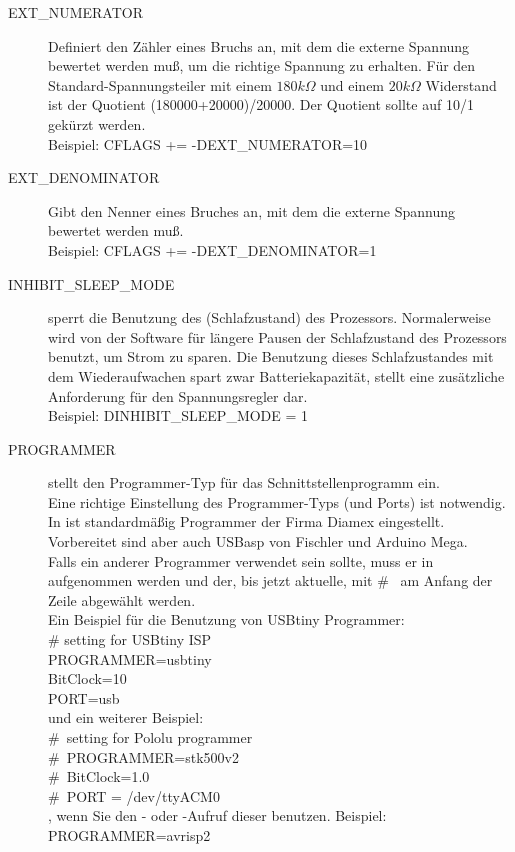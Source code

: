 \begin{description}
 \item[EXT\_NUMERATOR] Definiert den Zähler eines Bruchs an, mit dem die externe Spannung bewertet werden muß,
um die richtige Spannung zu erhalten. Für den Standard-Spannungsteiler mit einem \(180 k\Omega\) und 
einem \(20 k\Omega\) Widerstand ist der Quotient (180000+20000)/20000.
Der Quotient sollte auf 10/1 gekürzt werden.\\
Beispiel: CFLAGS += -DEXT\_NUMERATOR=10

 \item[EXT\_DENOMINATOR] Gibt den Nenner eines Bruches an, mit dem die externe Spannung bewertet werden muß.\\
Beispiel: CFLAGS += -DEXT\_DENOMINATOR=1

  \item[INHIBIT\_SLEEP\_MODE] sperrt die Benutzung des  (Schlafzustand) des Prozessors.
Normalerweise wird von der Software für längere Pausen der Schlafzustand des Prozessors benutzt, um Strom zu sparen.
Die Benutzung dieses Schlafzustandes mit dem Wiederaufwachen spart zwar Batteriekapazität, 
stellt eine zusätzliche Anforderung für den Spannungsregler dar.\\
Beispiel: DINHIBIT\_SLEEP\_MODE = 1

  \item[PROGRAMMER] \label{sec:config-Prog} stellt den Programmer-Typ für das  Schnittstellenprogramm ein.\\
Eine richtige Einstellung des Programmer-Typs (und Ports) ist notwendig.\\
In  ist standardmäßig Programmer der Firma Diamex eingestellt.\\
Vorbereitet sind aber auch USBasp von Fischler und Arduino Mega.\\
Falls ein anderer Programmer verwendet sein sollte, muss er in  aufgenommen werden und der,
bis jetzt aktuelle, mit \#~ am Anfang der Zeile abgewählt werden.\\
Ein Beispiel für die Benutzung von USBtiny Programmer:\\
\# setting for USBtiny ISP\\
PROGRAMMER=usbtiny\\
BitClock=10\\
PORT=usb\\
und ein weiterer Beispiel:\\
\#~setting for Pololu programmer\\
\#~PROGRAMMER=stk500v2\\
\#~BitClock=1.0\\
\#~PORT = /dev/ttyACM0\\
, wenn Sie den - oder
-Aufruf dieser  benutzen.
Beispiel: PROGRAMMER=avrisp2


\end{description}
